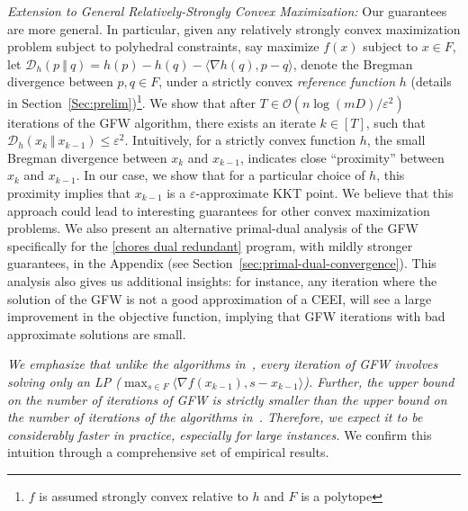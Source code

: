 \documentclass[format=acmsmall,authorversion]{acmart}
\begin{document}
{\em Extension to General Relatively-Strongly Convex Maximization:} Our guarantees are more general. In particular, given any relatively strongly convex maximization problem subject to polyhedral constraints, say maximize $f (x)$ subject to $ x \in F$, let $\mathcal D_h(p \ \Vert \ q) = h(p) - h(q) - \langle \nabla h(q), p-q \rangle$, denote the Bregman divergence between $p,q \in F$, under a strictly convex \emph{reference function} $h$ (details in Section~\ref{Sec:prelim})\footnote{$f$ is assumed strongly convex relative to $h$ and $F$ is a polytope}. We show that after $T \in \mathcal{O}(n\log (mD)/ \varepsilon^2)$ iterations of the GFW algorithm, there exists an iterate $k \in [T]$, such that $\mathcal D_h(x_k \ \Vert \ x_{k-1}) \leq \varepsilon^2$. Intuitively, for a strictly convex function $h$, the small Bregman divergence between $x_k$ and $x_{k-1}$, indicates close ``proximity'' between $x_k$ and $x_{k-1}$.%
In our case, we show that for a particular choice of $h$, this proximity implies that $x_{k-1}$ is a $\varepsilon$-approximate KKT point. We believe that this approach could lead to interesting guarantees for other convex maximization problems.  We also present an alternative primal-dual analysis of the GFW specifically for the \ref{chores dual redundant} program, with mildly stronger guarantees, in the Appendix (see Section~\ref{sec:primal-dual-convergence}). This analysis also gives us additional insights: for instance, any iteration where the solution of the GFW is not a good approximation of a CEEI, will see a large improvement in the objective function, implying that GFW iterations with bad approximate solutions are small.



\emph{We emphasize that unlike the algorithms in~\cite{boodaghians2022polynomial, ChaudhuryGMM22},  every iteration of GFW involves solving only an LP ($\max_{s \in F} \langle \nabla f(x_{k-1}), s - x_{k-1} \rangle$). Further, the upper bound on the number of iterations of GFW is strictly smaller than the upper bound on the number of iterations of the algorithms in~\cite{boodaghians2022polynomial, ChaudhuryGMM22}. Therefore, we expect it to be considerably faster in practice, especially for large instances.} We confirm this intuition through a comprehensive set of empirical results.
\end{document}
